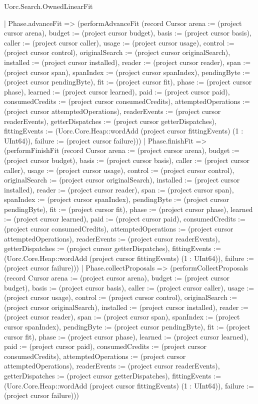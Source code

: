\begin{lexlean}{Uorc.Search.OwnedLinearFit}
\begin{semanticmodule}
{    | Phase.advanceFit => (performAdvanceFit (record Cursor {arena := (project cursor arena), budget := (project cursor budget), basis := (project cursor basis), caller := (project cursor caller), usage := (project cursor usage), control := (project cursor control), originalSearch := (project cursor originalSearch), installed := (project cursor installed), reader := (project cursor reader), span := (project cursor span), spanIndex := (project cursor spanIndex), pendingByte := (project cursor pendingByte), fit := (project cursor fit), phase := (project cursor phase), learned := (project cursor learned), paid := (project cursor paid), consumedCredits := (project cursor consumedCredits), attemptedOperations := (project cursor attemptedOperations), readerEvents := (project cursor readerEvents), getterDispatches := (project cursor getterDispatches), fittingEvents := (Uorc.Core.Heap::wordAdd (project cursor fittingEvents) (1 : UInt64)), failure := (project cursor failure)}))
    | Phase.finishFit => (performFinishFit (record Cursor {arena := (project cursor arena), budget := (project cursor budget), basis := (project cursor basis), caller := (project cursor caller), usage := (project cursor usage), control := (project cursor control), originalSearch := (project cursor originalSearch), installed := (project cursor installed), reader := (project cursor reader), span := (project cursor span), spanIndex := (project cursor spanIndex), pendingByte := (project cursor pendingByte), fit := (project cursor fit), phase := (project cursor phase), learned := (project cursor learned), paid := (project cursor paid), consumedCredits := (project cursor consumedCredits), attemptedOperations := (project cursor attemptedOperations), readerEvents := (project cursor readerEvents), getterDispatches := (project cursor getterDispatches), fittingEvents := (Uorc.Core.Heap::wordAdd (project cursor fittingEvents) (1 : UInt64)), failure := (project cursor failure)}))
    | Phase.collectProposals => (performCollectProposals (record Cursor {arena := (project cursor arena), budget := (project cursor budget), basis := (project cursor basis), caller := (project cursor caller), usage := (project cursor usage), control := (project cursor control), originalSearch := (project cursor originalSearch), installed := (project cursor installed), reader := (project cursor reader), span := (project cursor span), spanIndex := (project cursor spanIndex), pendingByte := (project cursor pendingByte), fit := (project cursor fit), phase := (project cursor phase), learned := (project cursor learned), paid := (project cursor paid), consumedCredits := (project cursor consumedCredits), attemptedOperations := (project cursor attemptedOperations), readerEvents := (project cursor readerEvents), getterDispatches := (project cursor getterDispatches), fittingEvents := (Uorc.Core.Heap::wordAdd (project cursor fittingEvents) (1 : UInt64)), failure := (project cursor failure)}))
}
\end{semanticmodule}
\end{lexlean}
